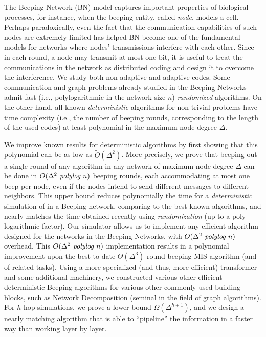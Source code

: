 The Beeping Network (BN) model captures important properties of 
biological processes, for instance, when the beeping entity, called \emph{node}, models a cell.
 Perhaps paradoxically, even the fact that the communication capabilities of such nodes are extremely limited has helped 
BN become one of the fundamental models for networks where nodes' transmissions interfere with each other. Since in each round, a node may transmit at most one bit, 
it is useful to treat the communications in the network as distributed coding and design it to overcome the interference. We study both non-adaptive and adaptive codes. Some communication and graph problems already studied in the Beeping Networks admit fast (i.e., polylogarithmic in the network size $n$) \emph{randomized} algorithms.
On the other hand, all known \emph{deterministic} algorithms for non-trivial problems have time complexity (i.e., the number of beeping rounds, corresponding to the length of the used codes) at least polynomial in the maximum node-degree $\Delta$. 

We improve known results for deterministic algorithms by first showing that this polynomial can be as low as $\tilde{O}(\Delta^2)$. More precisely, we prove that beeping out a single round of any \congest algorithm in any network of maximum node-degree $\Delta$ can be done in $O(\Delta^2 \text{\em\ polylog } n)$ beeping rounds, each accommodating at most one beep per node, even if the nodes intend to send different messages to different neighbors. This upper bound reduces polynomially the time for a \emph{deterministic} simulation of \congest in a Beeping network, comparing to the best known algorithms, and nearly matches the time obtained recently using \emph{randomization} (up to a poly-logarithmic factor). %
Our simulator allows us to implement any efficient algorithm designed for the \congest networks in the Beeping Networks, with $O(\Delta^2 \text{\em\ polylog } n)$ overhead. This $O(\Delta^2 \text{\em\ polylog } n)$ implementation results in a polynomial improvement upon the best-to-date $\Theta(\Delta^3)$-round beeping MIS algorithm (and of related tasks). Using a more specialized (and thus, more efficient) transformer and some additional machinery,  we constructed various other efficient deterministic Beeping algorithms for various other commonly used building blocks, such as 
 Network Decomposition (seminal in the field of \congest graph algorithms).
For $h$-hop simulations, we prove a lower bound $\Omega(\Delta^{h+1})$, and we design a nearly matching algorithm that is able to ``pipeline'' the information in a faster way than
 working layer by layer.

